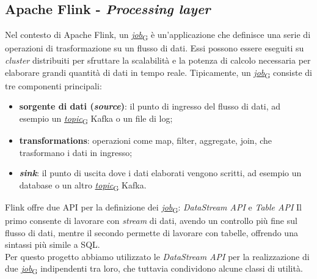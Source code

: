 \subsection{Apache Flink - \textit{Processing layer}}
Nel contesto di Apache Flink, un \href{https://7last.github.io/docs/pb/documentazione-interna/glossario\#job}{\textit{job}\textsubscript{G}} è un'applicazione che definisce una serie di operazioni di trasformazione su un flusso di dati.
Essi possono essere eseguiti su \textit{cluster} distribuiti per sfruttare la scalabilità e la potenza di calcolo necessaria per elaborare grandi quantità di dati in tempo reale.
Tipicamente, un \href{https://7last.github.io/docs/pb/documentazione-interna/glossario\#job}{\textit{job}\textsubscript{G}} consiste di tre componenti principali:
\begin{itemize}
	\item \textbf{sorgente di dati (\textit{source})}: il punto di ingresso del flusso di dati, ad esempio un \href{https://7last.github.io/docs/pb/documentazione-interna/glossario\#topic}{\textit{topic}\textsubscript{G}} Kafka o un file di log;
	\item \textbf{transformations}: operazioni come map, filter, aggregate, join, che trasformano i dati in ingresso;
	\item \textbf{\textit{sink}}: il punto di uscita dove i dati elaborati vengono scritti, ad esempio un database o un altro \href{https://7last.github.io/docs/pb/documentazione-interna/glossario\#topic}{\textit{topic}\textsubscript{G}} Kafka.
\end{itemize}
Flink offre due API per la definizione dei \href{https://7last.github.io/docs/pb/documentazione-interna/glossario\#job}{\textit{job}\textsubscript{G}}: \textit{DataStream API} e \textit{Table API}
Il primo consente di lavorare con \textit{stream} di dati, avendo un controllo più fine sul flusso di dati, mentre il secondo permette di lavorare con tabelle, offrendo una sintassi più simile a SQL.\\
Per questo progetto abbiamo utilizzato le \textit{DataStream API} per la realizzazione di due \href{https://7last.github.io/docs/pb/documentazione-interna/glossario\#job}{\textit{job}\textsubscript{G}} indipendenti tra loro, che tuttavia condividono alcune classi di utilità.

